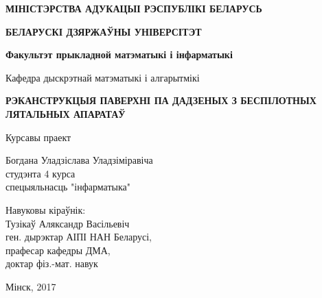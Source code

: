 \begin{titlepage}
    \begin{center}
        {\bf МІНІСТЭРСТВА АДУКАЦЫІ РЭСПУБЛІКІ БЕЛАРУСЬ}
    \end{center}
    \begin{center}
        {\bf БЕЛАРУСКІ ДЗЯРЖАЎНЫ УНІВЕРСІТЭТ}
    \end{center}
    \begin{center}
        {\bf Факультэт прыкладной матэматыкі і інфарматыкі}
    \end{center}
    \begin{center}
        Кафедра дыскрэтнай матэматыкі і алгарытмікі
    \end{center}

    \vspace{8em}

    \begin{center}
        {\bf РЭКАНСТРУКЦЫЯ ПАВЕРХНІ ПА ДАДЗЕНЫХ З БЕСПІЛОТНЫХ ЛЯТАЛЬНЫХ АПАРАТАЎ}
    \end{center}

    \vspace{2em}

    \begin{center}
        Курсавы праект
    \end{center}

    \vspace{3em}

    \begin{flushright}
        Богдана Уладзіслава Уладзіміравіча\\
        студэнта 4 курса\\
        спецыяльнасць "інфарматыка"\\
    \end{flushright}

    \vspace{1em}

    \begin{flushright}
        Навуковы кіраўнік:\\
        Тузікаў Аляксандр Васільевіч\\
        ген. дырэктар АІПІ НАН Беларусі,\\
        прафесар кафедры ДМА,\\
        доктар фіз.-мат. навук\\
    \end{flushright}

    \vfill

    \begin{center}
        Мінск, 2017
    \end{center}
\end{titlepage}
\newpage
